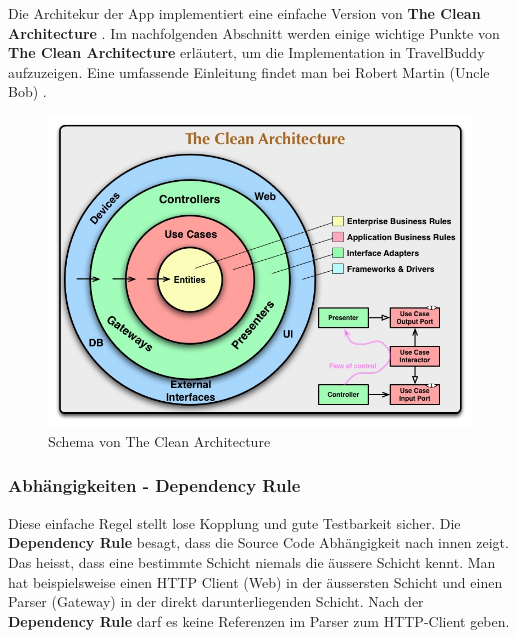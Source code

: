 \documentclass[a4paper,10pt,xetex]{article}
\begin{document}
Die Architekur der App implementiert eine einfache Version von \textbf{The Clean Architecture} \cite{TCA}.
Im nachfolgenden Abschnitt werden einige wichtige Punkte von \textbf{The Clean Architecture}
erläutert, um die Implementation in TravelBuddy aufzuzeigen. Eine umfassende
Einleitung findet man bei Robert Martin (Uncle Bob) \cite{CC}.
\begin{figure}
  \includegraphics{cleanarchitecture}
  \caption{Schema von The Clean Architecture}
\end{figure}

\subsubsection{Abhängigkeiten - Dependency Rule}\label{dependencyrule}
Diese einfache Regel stellt lose Kopplung und gute Testbarkeit sicher.
Die \textbf{Dependency Rule} besagt, dass die Source Code Abhängigkeit nach innen zeigt.
Das heisst, dass eine bestimmte Schicht niemals die äussere Schicht kennt.
Man hat beispielsweise einen HTTP Client (Web) in der äussersten Schicht und
einen Parser (Gateway) in der direkt darunterliegenden Schicht. Nach der
\textbf{Dependency Rule} darf es keine Referenzen im Parser zum HTTP-Client geben.

\newpage
\end{document}
